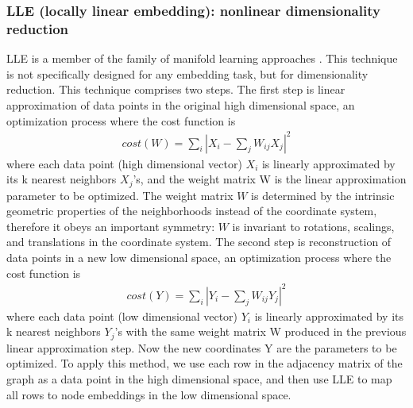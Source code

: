 \documentclass{article} %
\begin{document}
\subsubsection{LLE (locally linear embedding): nonlinear dimensionality reduction}
LLE is a member of the family of manifold learning approaches \citep{roweis2000nonlinear}.
This technique is not specifically designed for any embedding task, but for dimensionality reduction.
This technique comprises two steps.
The first step is linear approximation of data points in the original high dimensional space, an optimization process where the cost function is
\begin{align*}
	cost(W) = \sum_i |X_i - \sum_jW_{ij}X_j|^2
\end{align*}
where each data point (high dimensional vector) $ X_i $ is linearly approximated by its k nearest neighbors $ X_j $'s, and the weight matrix W is the linear approximation parameter to be optimized.
The weight matrix $ W $ is determined by the intrinsic geometric properties of the neighborhoods instead of the coordinate system, therefore it obeys an important symmetry: $ W $ is invariant to rotations, scalings, and translations in the coordinate system.
The second step is reconstruction of data points in a new low dimensional space, an optimization process where the cost function is
\begin{align*}
	cost(Y) = \sum_i |Y_i - \sum_jW_{ij}Y_j|^2
\end{align*}
where each data point (low dimensional vector) $ Y_i $ is linearly approximated by its k nearest neighbors $ Y_j $'s with the same weight matrix W produced in the previous linear approximation step. Now the new coordinates Y are the parameters to be optimized.
To apply this method, we use each row in the adjacency matrix of the graph as a data point in the high dimensional space, and then use LLE to map all rows to node embeddings in the low dimensional space.
\end{document}
